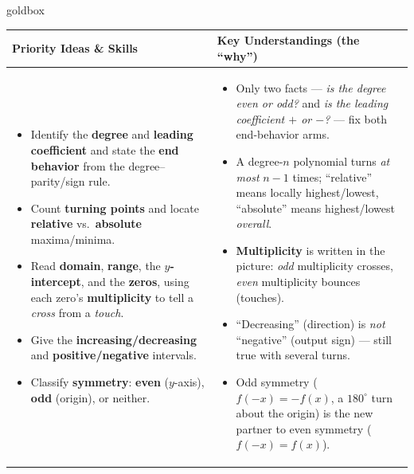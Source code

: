 \documentclass[10pt]{article}
\begin{document}
\renewcommand{\arraystretch}{1.4}
\begin{skillbox}{goldbox}
\begin{tabularx}{\linewidth}{@{}X|X@{}}
\textbf{Priority Ideas \& Skills} & \textbf{Key Understandings (the ``why'')} \\[2pt]
\hline
\vspace{-6pt}
\begin{itemize}[leftmargin=1.1em, nosep, after=\vspace{2pt}]
  \item Identify the \textbf{degree} and \textbf{leading coefficient} and state the \textbf{end behavior} from the degree--parity/sign rule.
  \item Count \textbf{turning points} and locate \textbf{relative} vs.\ \textbf{absolute} maxima/minima.
  \item Read \textbf{domain}, \textbf{range}, the \textbf{$y$-intercept}, and the \textbf{zeros}, using each zero's \textbf{multiplicity} to tell a \emph{cross} from a \emph{touch}.
  \item Give the \textbf{increasing/decreasing} and \textbf{positive/negative} intervals.
  \item Classify \textbf{symmetry}: \textbf{even} ($y$-axis), \textbf{odd} (origin), or neither.
\end{itemize}
&
\vspace{-6pt}
\begin{itemize}[leftmargin=1.1em, nosep, after=\vspace{2pt}]
  \item Only two facts --- \emph{is the degree even or odd?} and \emph{is the leading coefficient $+$ or $-$?} --- fix both end-behavior arms.
  \item A degree-$n$ polynomial turns \emph{at most} $n-1$ times; ``relative'' means locally highest/lowest, ``absolute'' means highest/lowest \emph{overall}.
  \item \textbf{Multiplicity} is written in the picture: \emph{odd} multiplicity crosses, \emph{even} multiplicity bounces (touches).
  \item ``Decreasing'' (direction) is \emph{not} ``negative'' (output sign) --- still true with several turns.
  \item Odd symmetry ($f(-x)=-f(x)$, a $180^\circ$ turn about the origin) is the new partner to even symmetry ($f(-x)=f(x)$).
\end{itemize}
\end{tabularx}
\end{skillbox}
\end{document}
